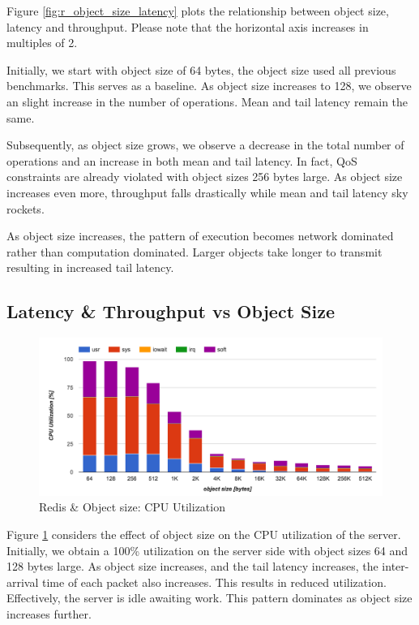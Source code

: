 Figure \ref{fig:r_object_size_latency} plots the relationship between object size, latency and throughput. Please note that the horizontal axis increases in multiples of 2.

Initially, we start with object size of 64 bytes, the object size used all previous benchmarks. This serves as a baseline. As object size increases to 128, we observe an slight increase in the number of operations. Mean and tail latency remain the same.

Subsequently, as object size grows, we observe a decrease in the total number of operations and an increase in both mean and tail latency. In fact, QoS constraints are already violated with object sizes 256 bytes large. As object size increases even more, throughput falls drastically while mean and tail latency sky rockets.

As object size increases, the pattern of execution becomes network dominated rather than computation dominated. Larger objects take longer to transmit resulting in increased tail latency.

\subsection{Latency \& Throughput vs Object Size}
\begin{figure}[h]
    \includegraphics[width=\textwidth]{./res2/r_object_size_cpu.png}
    \caption{Redis \& Object size: CPU Utilization}
    \label{fig:r_object_size_cpu}
\end{figure}

Figure \ref{fig:r_object_size_cpu} considers the effect of object size on the CPU utilization of the server. Initially, we obtain a 100\% utilization on the server side with object sizes 64 and 128 bytes large. As object size increases, and the tail latency increases, the inter-arrival time of each packet also increases. This results in reduced utilization. Effectively, the server is idle awaiting work. This pattern dominates as object size increases further.

